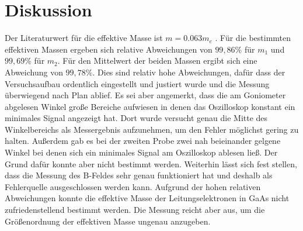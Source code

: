 \section{Diskussion}
\label{sec:Diskussion}
Der Literaturwert für die effektive Masse ist $m = 0.063m_e$ \cite{Masse}.
Für die bestimmten effektiven Massen ergeben sich relative Abweichungen von $99,86\%$ für $m_1$ und
$99,69\%$ für $m_2$. Für den Mittelwert der beiden Massen ergibt sich eine Abweichung von $99,78\%$.
Dies sind relativ hohe Abweichungen, dafür dass der Versuchsaufbau ordentlich eingestellt und justiert wurde und
die Messung überwiegend nach Plan ablief. Es sei aber angemerkt, dass die am Goniometer abgelesen Winkel
große Bereiche aufwiesen in denen das Oszilloskop konstant ein minimales Signal angezeigt hat. Dort wurde versucht
genau die Mitte des Winkelbereichs als Messergebnis aufzunehmen, um den Fehler möglichst gering zu halten.
Außerdem gab es bei der zweiten Probe zwei nah beieinander gelgene Winkel bei denen sich ein minimales Signal
am Oszilloskop ablesen ließ. Der Grund dafür konnte aber nicht bestimmt werden.
Weiterhin lässt sich fest stellen, dass die Messung des B-Feldes sehr genau funktioniert hat und deshalb als
Fehlerquelle ausgeschlossen werden kann. Aufgrund der hohen relativen Abweichungen konnte die effektive Masse
der Leitungselektronen in GaAs nicht zufriedenstellend bestimmt werden. Die Messung reicht aber aus, um
die Größenordnung der effektiven Masse ungenau anzugeben.
\newpage
